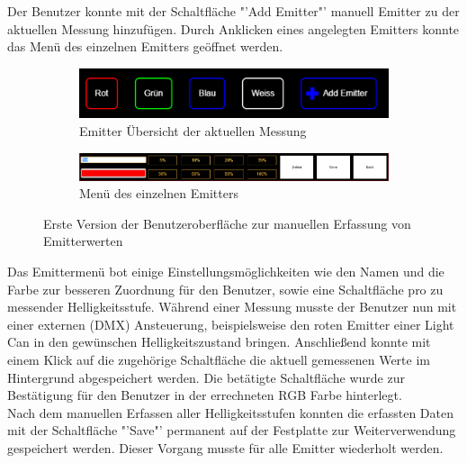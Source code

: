 \documentclass[11pt]{scrartcl}
\begin{document}
Der Benutzer konnte mit der Schaltfläche "'Add Emitter"' manuell Emitter zu der aktuellen Messung hinzufügen. Durch Anklicken eines angelegten
Emitters konnte das Menü des einzelnen Emitters geöffnet werden.
\begin{figure}[H]
    \centering
    \begin{subfigure}[b]{\textwidth}
        \includegraphics[width=\textwidth]{images/app_emitters_v1.png}
        \caption{Emitter Übersicht der aktuellen Messung}
    \end{subfigure}
    \hfill 
    \begin{subfigure}[b]{\textwidth}
        \includegraphics[width=\textwidth]{images/app_edit_emitters_v1.png}
        \caption{Menü des einzelnen Emitters}
    \end{subfigure}
    \caption{Erste Version der Benutzeroberfläche zur manuellen Erfassung von Emitterwerten}
\end{figure}
\noindent
Das Emittermenü bot einige Einstellungsmöglichkeiten wie den Namen und die Farbe zur besseren Zuordnung für den Benutzer, sowie eine Schaltfläche pro zu messender
Helligkeitsstufe. Während einer Messung musste der Benutzer nun mit einer externen (DMX) Ansteuerung, beispielsweise den roten
Emitter einer Light Can in den gewünschen Helligkeitszustand bringen. Anschließend konnte mit einem Klick auf die zugehörige Schaltfläche die
aktuell gemessenen Werte im Hintergrund abgespeichert werden. Die betätigte Schaltfläche wurde zur Bestätigung für den Benutzer in der errechneten
RGB Farbe hinterlegt.\\
Nach dem manuellen Erfassen aller Helligkeitsstufen konnten die erfassten Daten mit der Schaltfläche "'Save"' permanent auf der Festplatte zur
Weiterverwendung gespeichert werden. Dieser Vorgang musste für alle Emitter wiederholt werden.
\end{document}
